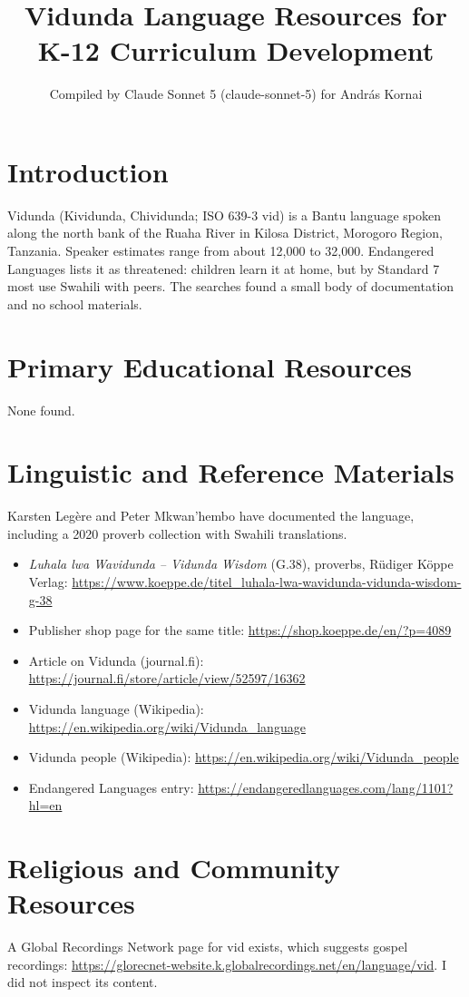 \documentclass[12pt]{article}
\title{Vidunda Language Resources for K-12 Curriculum Development}
\author{Compiled by Claude Sonnet 5 (claude-sonnet-5) for Andr\'as Kornai}
\date{}
\begin{document}
\maketitle

\section{Introduction}
Vidunda (Kividunda, Chividunda; ISO 639-3 vid) is a Bantu language spoken along the north bank of the Ruaha River in Kilosa District, Morogoro Region, Tanzania. Speaker estimates range from about 12,000 to 32,000. Endangered Languages lists it as threatened: children learn it at home, but by Standard 7 most use Swahili with peers. The searches found a small body of documentation and no school materials.

\section{Primary Educational Resources}
None found.

\section{Linguistic and Reference Materials}
Karsten Legère and Peter Mkwan'hembo have documented the language, including a 2020 proverb collection with Swahili translations.
\begin{itemize}
\item \emph{Luhala lwa Wavidunda -- Vidunda Wisdom} (G.38), proverbs, R\"udiger K\"oppe Verlag: \url{https://www.koeppe.de/titel_luhala-lwa-wavidunda-vidunda-wisdom-g-38}
\item Publisher shop page for the same title: \url{https://shop.koeppe.de/en/?p=4089}
\item Article on Vidunda (journal.fi): \url{https://journal.fi/store/article/view/52597/16362}
\item Vidunda language (Wikipedia): \url{https://en.wikipedia.org/wiki/Vidunda_language}
\item Vidunda people (Wikipedia): \url{https://en.wikipedia.org/wiki/Vidunda_people}
\item Endangered Languages entry: \url{https://endangeredlanguages.com/lang/1101?hl=en}
\end{itemize}

\section{Religious and Community Resources}
A Global Recordings Network page for vid exists, which suggests gospel recordings: \url{https://glorecnet-website.k.globalrecordings.net/en/language/vid}. I did not inspect its content.
\end{document}
